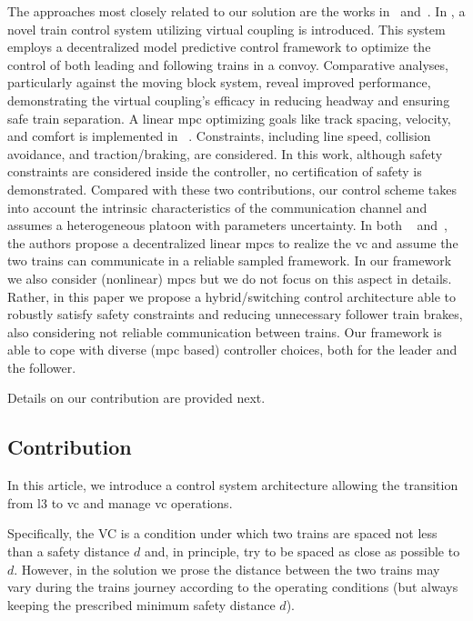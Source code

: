 \documentclass[letterpaper, 10 pt, conference]{ieeeconf}
\theoremstyle{definition}
\theoremstyle{nopoint}
\newcommand{\red}[1]{%
	{\color{red}{#1}}%
}
\begin{document}
\red{ADD ROBUSTEZZA AND COMUNICAZIONE ENFATIZZAZ RISPETTO AI PAPER CITATI}
The approaches most closely related to our solution are the works in~\cite{felez2019model} and~\cite{wu2021virtually}. In \cite{felez2019model}, a novel train control system utilizing virtual coupling is introduced. This system employs a decentralized model predictive control framework to optimize the control of both leading and following trains in a convoy. Comparative analyses, particularly against the moving block system, reveal improved performance, demonstrating the virtual coupling's efficacy in reducing headway and ensuring safe train separation. A linear \gls{mpc} optimizing goals like track spacing, velocity, and comfort is implemented in ~\cite{wu2021virtually}. Constraints, including line speed, collision avoidance, and traction/braking, are considered. In this work, although  safety constraints are considered inside the controller, no certification of safety is demonstrated. Compared with these two contributions, our control scheme takes into account the intrinsic characteristics of the communication channel and assumes a heterogeneous platoon with parameters uncertainty. In both ~\cite{felez2019model} and~\cite{wu2021virtually}, the authors propose a decentralized linear \glspl{mpc} to realize the \gls{vc} and assume the two trains can communicate in a reliable sampled framework.
In our framework we also consider (nonlinear) \glspl{mpc} but we do not focus on this aspect in details. 
Rather, in this paper we propose a hybrid/switching control architecture able to robustly satisfy safety constraints and reducing unnecessary follower train brakes, also considering not reliable communication between trains. Our framework is able to cope with diverse (\gls{mpc} based) controller choices, both for the leader and the follower. 

Details on our contribution are provided next.


\subsection{Contribution}
\label{subsec:contribution}
%

In this article, we introduce a control system architecture
allowing the transition from \gls{l3} to \gls{vc} and manage \gls{vc} operations. 

Specifically, the VC is a condition under which two trains are spaced not less than a safety distance $d$ and, in principle, try to be spaced as close as possible to $d$. 
However, in the solution we prose the distance between the two trains may vary during the trains journey according to the operating conditions (but always keeping the prescribed minimum safety distance $d$).
\end{document}
